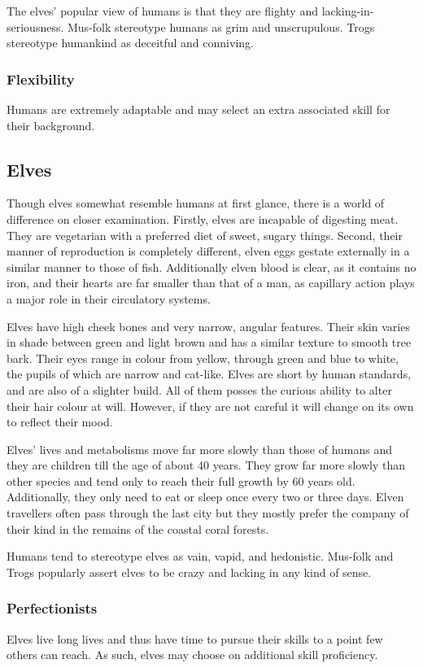 \documentclass[a4paper,11pt,oneside]{book}
\begin{document}
The elves' popular view of humans is that they are flighty and lacking-in-seriousness. Mus-folk stereotype humans as grim and unscrupulous. Trogs stereotype humankind as deceitful and conniving.  

\subsubsection*{Flexibility}
Humans are extremely adaptable and may select an extra associated skill for their background.

\subsection{Elves}
Though elves somewhat resemble humans at first glance, there is a world of difference on closer examination. Firstly, elves are incapable of digesting meat. They are vegetarian with a preferred diet of sweet, sugary things. Second, their manner of reproduction is completely different, elven eggs gestate externally in a similar manner to those of fish. Additionally elven blood is clear, as it contains no iron, and their hearts are far smaller than that of a man, as capillary action plays a major role in their circulatory systems.

Elves have high cheek bones and very narrow, angular features. Their skin varies in shade between green and light brown and has a similar texture to smooth tree bark. Their eyes range in colour from yellow, through green and blue to white, the pupils of which are narrow and cat-like. Elves are short by human standards, and are also of a slighter build. All of them posses the curious ability to alter their hair colour at will. However, if they are not careful it will change on its own to reflect their mood. 

Elves' lives and metabolisms move far more slowly than those of humans and they are children till the age of about 40 years. They grow far more slowly than other species and tend only to reach their full growth by 60 years old. Additionally, they only need to eat or sleep once every two or three days. Elven travellers often pass through the last city but they mostly prefer the company of their kind in the remains of the coastal coral forests.

Humans tend to stereotype elves as vain, vapid, and hedonistic. Mus-folk and Trogs popularly assert elves to be crazy and lacking in any kind of sense. 

\subsubsection*{Perfectionists}
Elves live long lives and thus have time to pursue their skills to a point few others can reach. As such, elves may choose on additional skill proficiency.
\end{document}
